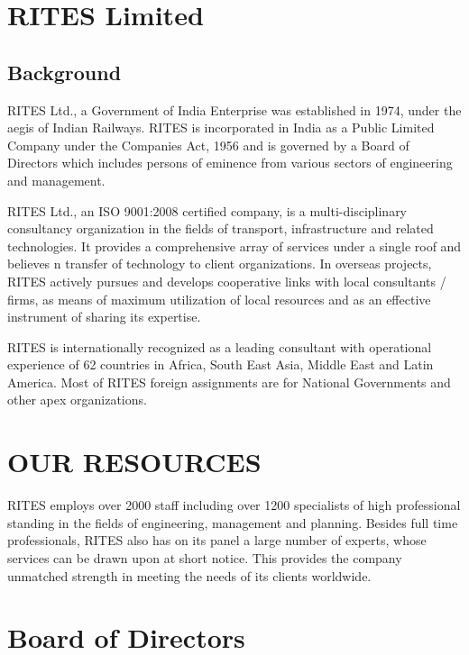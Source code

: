 \section{RITES Limited}

\subsection{Background}


RITES Ltd., a Government of India Enterprise was established in 1974, under the aegis of Indian Railways. RITES is incorporated in India as a Public Limited Company under the Companies Act, 1956 and is governed by a Board of Directors which includes persons of eminence from various sectors of engineering and management.

RITES Ltd., an ISO 9001:2008 certified company, is a multi-disciplinary consultancy organization in the fields of transport, infrastructure and related technologies. It provides a comprehensive array of services under a single roof and believes n transfer of technology to client organizations. In overseas projects, RITES actively pursues and develops cooperative links with local consultants / firms, as means of maximum utilization of local resources and as an effective instrument of sharing its expertise.

RITES is internationally recognized as a leading consultant with operational experience of 62 countries in Africa, South East Asia, Middle East and Latin America. Most of RITES foreign assignments are for National Governments and other apex organizations.

\section{OUR RESOURCES}

RITES employs over 2000 staff including over 1200 specialists of high professional standing in the fields of engineering, management and planning. Besides full time professionals, RITES also has on its panel a large number of experts, whose services can be drawn upon at short notice. 
This provides the company unmatched strength in meeting the needs of its clients worldwide.



\section{Board of Directors}
\noindent

